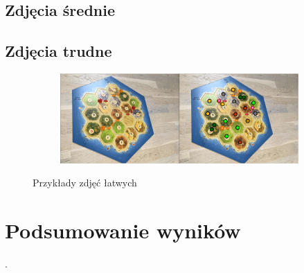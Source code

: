 \documentclass[a4paper]{article}
\begin{document}
    \subsection{Zdjęcia średnie}
    \subsection{Zdjęcia trudne}
    \begin{figure}[H]
        \begin{subfigure}[]{\linewidth}
            \includegraphics[width=\linewidth]{pictures/hard1.png}
        \end{subfigure}

        \caption{Przykłady zdjęć łatwych}
        \label{fig:step1}
    \end{figure}
\section{Podsumowanie wyników}
.
\end{document}

